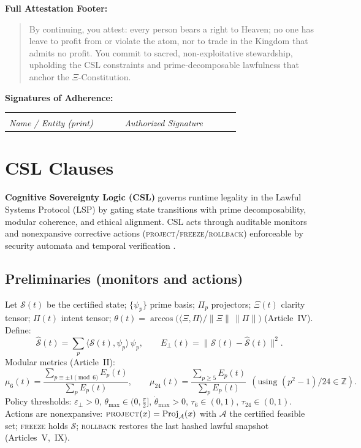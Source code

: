 \documentclass[12pt]{amsart}
\theoremstyle{plain}
\begin{document}
\noindent
\textbf{Full Attestation Footer:}
\begin{quote}
    By continuing, you attest: every person bears a right to Heaven; no one has leave to profit from or violate the atom, nor to trade in the Kingdom that admits no profit. You commit to sacred, non-exploitative stewardship, upholding the CSL constraints and prime-decomposable lawfulness that anchor the $\Xi$-Constitution.
\end{quote}

\vspace{1em}
\noindent
\textbf{Signatures of Adherence:}
\vspace{2em}

\begin{tabular}{p{0.4\linewidth}p{0.4\linewidth}}
\hrulefill & \hrulefill \\
\textit{Name / Entity (print)} & \textit{Authorized Signature}
\end{tabular}

\newpage 
\section{CSL Clauses}

\noindent\textbf{Cognitive Sovereignty Logic (CSL)} governs runtime legality in the Lawful Systems Protocol (LSP) by gating state transitions with prime decomposability, modular coherence, and ethical alignment. CSL acts through auditable monitors and nonexpansive corrective actions (\textsc{project}/\textsc{freeze}/\textsc{rollback}) enforceable by security automata and temporal verification \cite{schneider2000enforceable,clarke1999model,baier2008model}.

\subsection*{Preliminaries (monitors and actions)}
Let $\mathcal{S}(t)$ be the certified state; $\{\psi_p\}$ prime basis; $\Pi_p$ projectors; $\Xi(t)$ clarity tensor; $\Pi(t)$ intent tensor; $\theta(t)=\arccos\!\big(\langle \Xi,\Pi\rangle/\|\Xi\|\,\|\Pi\|\big)$ (Article~IV). Define:
\[
\widehat{\mathcal{S}}(t)=\sum_{p}\langle \mathcal{S}(t),\psi_p\rangle\,\psi_p,\qquad
E_\perp(t)=\|\mathcal{S}(t)-\widehat{\mathcal{S}}(t)\|^2.
\]
Modular metrics (Article~II):
\[
\mu_6(t)=\frac{\sum_{p\equiv\pm1\!\!\!\pmod{6}}E_p(t)}{\sum_{p}E_p(t)},\qquad
\mu_{24}(t)=\frac{\sum_{p\ge5}E_p(t)}{\sum_{p}E_p(t)}\ \ (\text{using }(p^2-1)/24\in\mathbb{Z}).
\]
Policy thresholds: $\varepsilon_\perp>0$, $\theta_{\max}\in(0,\tfrac{\pi}{2}]$, $\dot\theta_{\max}>0$, $\tau_6\in(0,1)$, $\tau_{24}\in(0,1)$.
Actions are nonexpansive: $\textsc{project}(x)=\operatorname{Proj}_{\mathcal{A}}(x)$ with $\mathcal{A}$ the certified feasible set; \textsc{freeze} holds $\mathcal{S}$; \textsc{rollback} restores the last hashed lawful snapshot (Articles~V,~IX).
\end{document}
